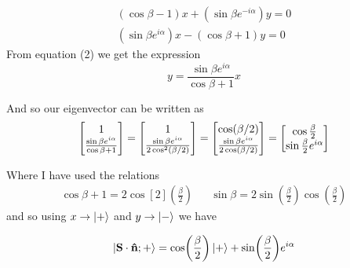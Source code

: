 \begin{gather}
	(\cos\beta - 1)x + (\sin\beta e^{-i\alpha})y = 0\\
	(\sin\beta e^{i\alpha})x -(\cos\beta + 1)y = 0
\end{gather}
From equation (2) we get the expression
\[
	y= \frac{\sin\beta e^{i\alpha}}{\cos\beta+1} x
\]

And so our eigenvector can be written as
\begin{gather*}
	\mqty[1 \\ \frac{\sin\beta e^{i\alpha}}{\cos\beta+1}] = \mqty[ 1 \\ \frac{\sin\beta e^{i\alpha}}{2\cos[2](\beta/2)}] = \mqty[\cos(\beta/2)\\ \frac{\sin\beta e^{i\alpha}}{2\cos(\beta/2)} ] = \mqty[  \cos\frac\beta2\\ \sin\frac\beta2 e^{i\alpha}  ]
\end{gather*}

Where I have used the relations
\begin{align*}
	\cos\beta + 1 = 2\cos[2](\frac{\beta}{2}) &  & \sin\beta = 2\sin(\frac\beta2) \cos(\frac\beta2)
\end{align*}
and so using $x \to \ket +$ and $y \to \ket -$ we have

\[
	\ket{\vb S\cdot\vu n;+} = \cos(\frac\beta2) \ket + + \sin(\frac\beta2)e^{i\alpha}
\]
